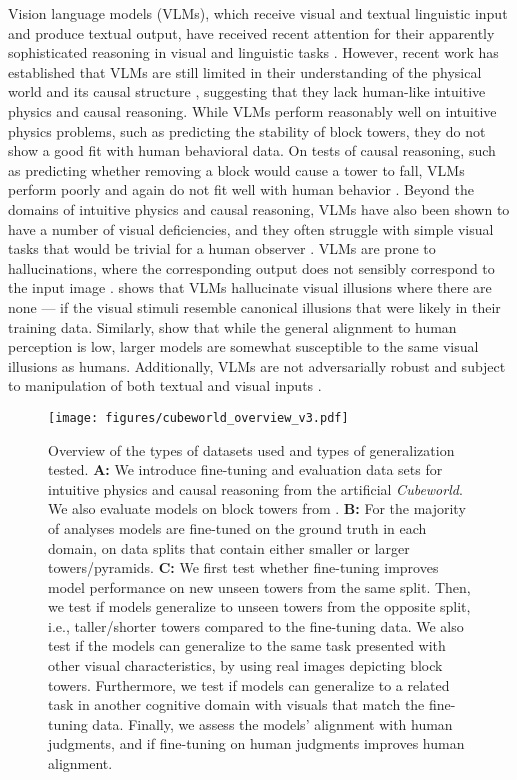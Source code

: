 Vision language models (VLMs), which receive visual and textual linguistic input and produce textual output, have received recent attention for their apparently sophisticated reasoning in visual and linguistic tasks \cite{MMBench}. However, recent work has established that VLMs are still limited in their understanding of the physical world and its causal structure \citep{jin2023cladder, balazadeh2024synthetic}, suggesting that they lack human-like intuitive physics and causal reasoning. While VLMs perform reasonably well on intuitive physics problems, such as predicting the stability of block towers, they do not show a good fit with human behavioral data. On tests of causal reasoning, such as predicting whether removing a block would cause a tower to fall, VLMs perform poorly and again do not fit well with human behavior \citep{schulze2025visual}. Beyond the domains of intuitive physics and causal reasoning, VLMs have also been shown to have a number of visual deficiencies, and they often struggle with simple visual tasks that would be trivial for a human observer \citep{rahmanzadehgervi2024vision, schulze2025visual, balazadeh2024synthetic}. VLMs are prone to hallucinations, where the corresponding output does not sensibly correspond to the input image \citep{li2023evaluating, liu2024survey}. \citet{ullman2024illusion} shows that VLMs hallucinate visual illusions where there are none --- if the visual stimuli resemble canonical illusions that were likely in their training data. Similarly, \citet{zhang2023grounding} show that while the general alignment to human perception is low, larger models are somewhat susceptible to the same visual illusions as humans. Additionally, VLMs are not adversarially robust and subject to manipulation of both textual and visual inputs \citep{zhao2024evaluating}. 

\begin{figure*}[ht]
    \centering
    \vspace{0.2cm}
    \texttt{[image: figures/cubeworld\_overview\_v3.pdf]}
    \vspace{-0.4cm}
    \caption{Overview of the types of datasets used and types of generalization tested. \textbf{A:} We introduce fine-tuning and evaluation data sets for intuitive physics and causal reasoning from the artificial \emph{Cubeworld}. We also evaluate models on block towers from \citet{lerer2016learning}. \textbf{B:} For the majority of analyses models are fine-tuned on the ground truth in each domain, on data splits that contain either smaller or larger towers/pyramids. \textbf{C:} We first test whether fine-tuning improves model performance on new unseen towers from the same split. Then, we test if models generalize to unseen towers from the opposite split, i.e., taller/shorter towers compared to the fine-tuning data. We also test if the models can generalize to the same task presented with other visual characteristics, by using real images depicting block towers. Furthermore, we test if models can generalize to a related task in another cognitive domain with visuals that match the fine-tuning data. Finally, we assess the models' alignment with human judgments, and if fine-tuning on human judgments improves human alignment.}
    \label{fig:overview}
\end{figure*}


